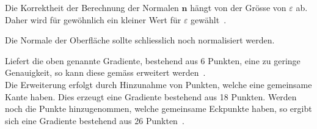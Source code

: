 Die Korrektheit der Berechnung der Normalen $\bm{n}$ hängt von der
Grösse von $\varepsilon$ ab. Daher wird für gewöhnlich ein kleiner Wert
für $\varepsilon$ gewählt~\parencite[S. 293]{hart_ray_1989}.

Die Normale der Oberfläche sollte schliesslich noch normalisiert werden.

Liefert die oben genannte Gradiente, bestehend aus 6 Punkten, eine zu
geringe Genauigkeit, so kann diese gemäss \citeauthor{hart_ray_1989}
erweitert werden~\parencite[S. 293]{hart_ray_1989}.\\
Die Erweiterung erfolgt durch Hinzunahme von Punkten, welche eine
gemeinsame Kante haben. Dies erzeugt eine Gradiente bestehend aus 18
Punkten. Werden noch die Punkte hinzugenommen, welche gemeinsame
Eckpunkte haben, so ergibt sich eine Gradiente bestehend aus 26
Punkten~\parencite[S. 293]{hart_ray_1989}.
